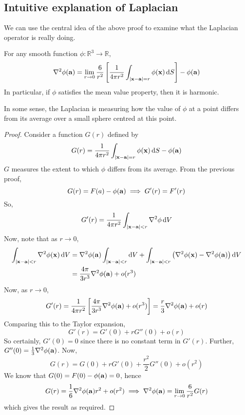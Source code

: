\subsection{Intuitive explanation of Laplacian}
We can use the central idea of the above proof to examine what the Laplacian operator is really doing.
\begin{proposition}
	For any smooth function \(\phi \colon \mathbb R^3 \to \mathbb R\),
	\[
		\laplacian\phi(\vb a) = \lim_{r \to 0} \frac{6}{r^2} \left[ \frac{1}{4\pi r^2} \int_{\abs{\vb x - \vb a} = r} \phi(\vb x) \dd{S} \right] - \phi(\vb a)
	\]
	In particular, if \(\phi\) satisfies the mean value property, then it is harmonic.
\end{proposition}
In some sense, the Laplacian is measuring how the value of \(\phi\) at a point differs from its average over a small sphere centred at this point.
\begin{proof}
	Consider a function \(G(r)\) defined by
	\[
		G(r) = \frac{1}{4\pi r^2} \int_{\abs{\vb x - \vb a} = r} \phi(\vb x) \dd{S} - \phi(\vb a)
	\]
	\(G\) measures the extent to which \(\phi\) differs from its average.
	From the previous proof,
	\[
		G(r) = F(a) - \phi(\vb a) \implies G'(r) = F'(r)
	\]
	So,
	\[
		G'(r) = \frac{1}{4\pi r^2} \int_{\abs{\vb x - \vb a} < r} \laplacian{\phi} \dd{V}
	\]
	Now, note that as \(r \to 0\),
	\begin{align*}
		\int_{\abs{\vb x - \vb a} < r} \laplacian \phi(\vb x) \dd{V} & = \laplacian\phi(\vb a) \int_{\abs{\vb x - \vb a} < r} \dd{V} + \int_{\abs{\vb x - \vb a} < r} \left( \laplacian\phi(\vb x) - \laplacian\phi(\vb a) \right) \dd{V} \\
		                                                             & = \frac{4\pi}{3r^3} \laplacian\phi(\vb a) + o(r^3)
	\end{align*}
	Now, as \(r \to 0\),
	\[
		G'(r) = \frac{1}{4\pi r^2} \left[ \frac{4\pi}{3r^3} \laplacian\phi(\vb a) + o(r^3) \right] = \frac{r}{3}\laplacian\phi(\vb a) + o(r)
	\]
	Comparing this to the Taylor expansion,
	\[
		G'(r) = G'(0) + rG''(0) + o(r)
	\]
	So certainly, \(G'(0) = 0\) since there is no constant term in \(G'(r)\).
	Further, \(G''(0) = \frac{1}{3}\laplacian\phi(\vb a)\).
	Now,
	\[
		G(r) = G(0) + rG'(0) + \frac{r^2}{2}G''(0) + o(r^2)
	\]
	We know that \(G(0) = F(0) - \phi(\vb a) = 0\), hence
	\[
		G(r) = \frac{1}{6}\laplacian\phi(\vb a) r^2 + o(r^2) \implies \laplacian\phi(\vb a) = \lim_{r \to 0} \frac{6}{r^2}G(r)
	\]
	which gives the result as required.
\end{proof}

